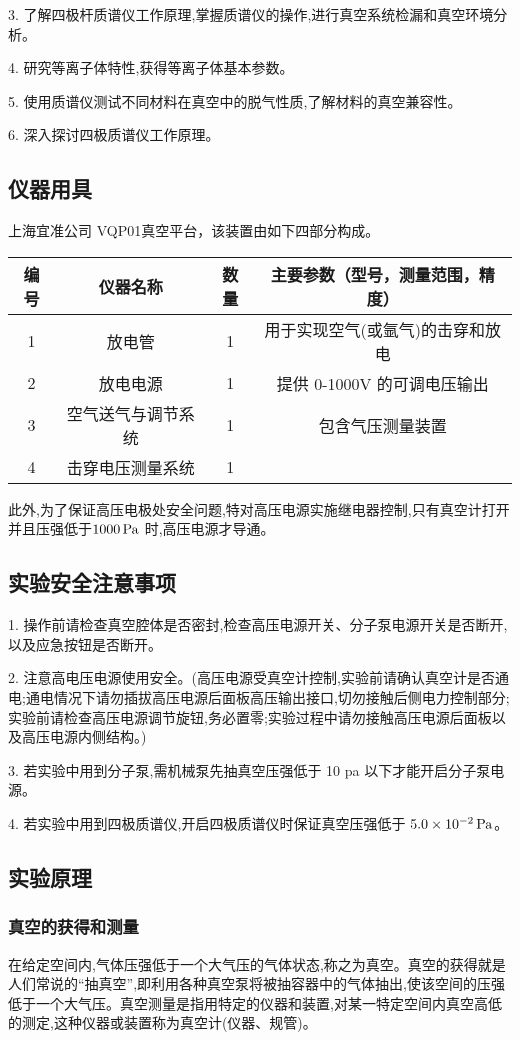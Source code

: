 \documentclass{article}
\begin{document}
3. 了解四极杆质谱仪工作原理,掌握质谱仪的操作,进行真空系统检漏和真空环境分
析。

4. 研究等离子体特性,获得等离子体基本参数。

5. 使用质谱仪测试不同材料在真空中的脱气性质,了解材料的真空兼容性。

6. 深入探讨四极质谱仪工作原理。
\subsection{仪器用具}
上海宜准公司 VQP01真空平台，该装置由如下四部分构成。

\begin{tabular}{c|c|c|c}
	\hline
        编号 & 仪器名称 &数量& 主要参数（型号，测量范围，精度） \\
	\hline 
	1 &  放电管&1 & 用于实现空气(或氩气)的击穿和放电\\
        2 &  放电电源&1 &提供 0-1000V 的可调电压输出\\
        3 &  空气送气与调节系统&1& 包含气压测量装置\\
        4 &  击穿电压测量系统 &1&\\
	\hline
\end{tabular}

此外,为了保证高压电极处安全问题,特对高压电源实施继电器控制,只有真空计打开并且压强低于$1000\,\mathrm{Pa}$ 时,高压电源才导通。
\subsection{实验安全注意事项}

1. 操作前请检查真空腔体是否密封,检查高压电源开关、分子泵电源开关是否断开,以及应急按钮是否断开。

2. 注意高电压电源使用安全。(高压电源受真空计控制,实验前请确认真空计是否通电;通电情况下请勿插拔高压电源后面板高压输出接口,切勿接触后侧电力控制部分;实验前请检查高压电源调节旋钮,务必置零;实验过程中请勿接触高压电源后面板以及高压电源内侧结构。)

3. 若实验中用到分子泵,需机械泵先抽真空压强低于 10 pa 以下才能开启分子泵电源。

4. 若实验中用到四极质谱仪,开启四极质谱仪时保证真空压强低于 $5.0\times 10^{-2}\,\mathrm{Pa}$。

\subsection{实验原理}
\subsubsection{真空的获得和测量}
在给定空间内,气体压强低于一个大气压的气体状态,称之为真空。真空的获得就是人们常说的“抽真空”,即利用各种真空泵将被抽容器中的气体抽出,使该空间的压强低于一个大气压。真空测量是指用特定的仪器和装置,对某一特定空间内真空高低的测定,这种仪器或装置称为真空计(仪器、规管)。
\end{document}
